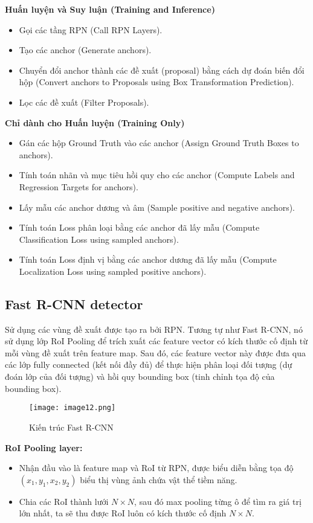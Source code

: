\documentclass{article}
\begin{document}
\textbf{Huấn luyện và Suy luận (Training and Inference)}
\begin{itemize}
    \item Gọi các tầng RPN (Call RPN Layers).
    \item Tạo các anchor (Generate anchors).
    \item Chuyển đổi anchor thành các đề xuất (proposal) bằng cách dự đoán biến đổi hộp (Convert anchors to Proposals using Box Transformation Prediction).
    \item Lọc các đề xuất (Filter Proposals).
\end{itemize}

\textbf{Chỉ dành cho Huấn luyện (Training Only)}
\begin{itemize}
    \item Gán các hộp Ground Truth vào các anchor (Assign Ground Truth Boxes to anchors).
    \item Tính toán nhãn và mục tiêu hồi quy cho các anchor (Compute Labels and Regression Targets for anchors).
    \item Lấy mẫu các anchor dương và âm (Sample positive and negative anchors).
    \item Tính toán Loss phân loại bằng các anchor đã lấy mẫu (Compute Classification Loss using sampled anchors).
    \item Tính toán Loss định vị bằng các anchor dương đã lấy mẫu (Compute Localization Loss using sampled positive anchors).
\end{itemize}

\subsection{Fast R-CNN detector}
Sử dụng các vùng đề xuất được tạo ra bởi RPN. Tương tự như Fast R-CNN, nó sử dụng lớp RoI Pooling để trích xuất các feature vector có kích thước cố định từ mỗi vùng đề xuất trên feature map. Sau đó, các feature vector này được đưa qua các lớp fully connected (kết nối đầy đủ) để thực hiện phân loại đối tượng (dự đoán lớp của đối tượng) và hồi quy bounding box (tinh chỉnh tọa độ của bounding box).

\begin{figure}[H]
    \centering
    \texttt{[image: image12.png]}
    \caption{Kiến trúc Fast R-CNN}
\end{figure}

\textbf{RoI Pooling layer:}
\begin{itemize}
    \item Nhận đầu vào là feature map và RoI từ RPN, được biểu diễn bằng tọa độ $(x_1, y_1, x_2, y_2)$ biểu thị vùng ảnh chứa vật thể tiềm năng.
    \item Chia các RoI thành lưới $N \times N$, sau đó max pooling từng ô để tìm ra giá trị lớn nhất, ta sẽ thu được RoI luôn có kích thước cố định $N \times N$.
\end{itemize}
\end{document}
